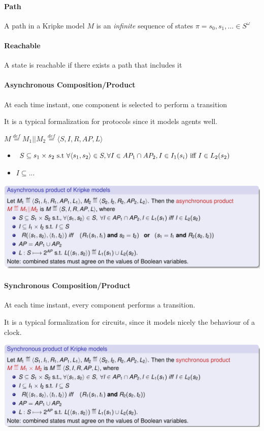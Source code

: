 \documentclass{article}
\begin{document}
\paragraph{Path} A path in a Kripke model $M$ is an \textit{infinite} sequence of states $\pi = s_0, s_1, \dots \in S^\omega$

\paragraph{Reachable} A state is reachable if there exists a path that includes it

\paragraph{Asynchronous Composition/Product} At each time instant, one component is selected to perform a transition

It is a typical formalization for protocols since it models agents well.

$M\overset{def}= M_1||M_2\overset{def}= \langle S,I,R,AP,L\rangle$
\begin{itemize}
    \item $S \subseteq s_1\times s_2 \text{ s.t } \forall\langle s_1,s_2\rangle \in S, \forall I \in AP_1\cap AP_2, I\in I_1(s_i) \text{ iff } I \in L_2(s_2)$
    \item $I \subseteq ...$
\end{itemize}
\begin{center}
    \includegraphics[width=1\linewidth]{images/async_prod.png}
\end{center}

\paragraph{Synchronous Composition/Product} At each time instant, every component performs a transition.

It is a typical formalization for circuits, since it models nicely the behaviour of a clock.
\begin{center}
    \includegraphics[width=1\linewidth]{images/sync_prod.png}
\end{center}
\end{document}
